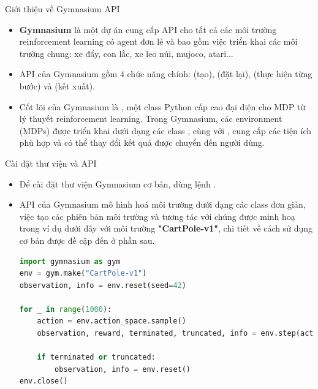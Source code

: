 \documentclass[10pt,aspectratio=169]{beamer}
\begin{document}
\begin{frame}{Giới thiệu về Gymnasium API}
\begin{itemize}
\setlength\itemsep{8pt}
\item \textcolor{mainblue}{\textbf{Gymnasium}} là một dự án cung cấp API cho tất cả các môi trường reinforcement learning có agent đơn lẻ và bao gồm việc triển khai các môi trường chung: xe đẩy, con lắc, xe leo núi, mujoco, atari...
\item API của Gymnasium gồm 4 chức năng chính:  (tạo),  (đặt lại),  (thực hiện từng bước) và  (kết xuất).
\item Cốt lõi của Gymnasium là , một class Python cấp cao đại diện cho MDP từ lý thuyết reinforcement learning. Trong Gymnasium, các environment (MDPs) được triển khai dưới dạng các class , cùng với , cung cấp các tiện ích phù hợp và có thể thay đổi kết quả được chuyển đến người dùng.
\end{itemize}
\end{frame}

\begin{frame}[fragile]{Cài đặt thư viện và API}{\subsecname}
\begin{itemize}
\setlength\itemsep{8pt}
\item Để cài đặt thư viện Gymnasium cơ bản, dùng lệnh .
\item API của Gymnasium mô hình hoá môi trường dưới dạng các class  đơn giản, việc tạo các phiên bản môi trường và tương tác với chúng được minh hoạ trong ví dụ dưới đây với môi trường \textbf{"CartPole-v1"}, chi tiết về cách sử dụng cơ bản được đề cập đến ở phần sau.\\
\scriptsize
\begin{lstlisting}[language=Python]
import gymnasium as gym
env = gym.make("CartPole-v1")
observation, info = env.reset(seed=42)

for _ in range(1000):
    action = env.action_space.sample()
    observation, reward, terminated, truncated, info = env.step(action)

    if terminated or truncated:
        observation, info = env.reset()
env.close()
\end{lstlisting}
\end{itemize}
\end{frame}
\end{document}
